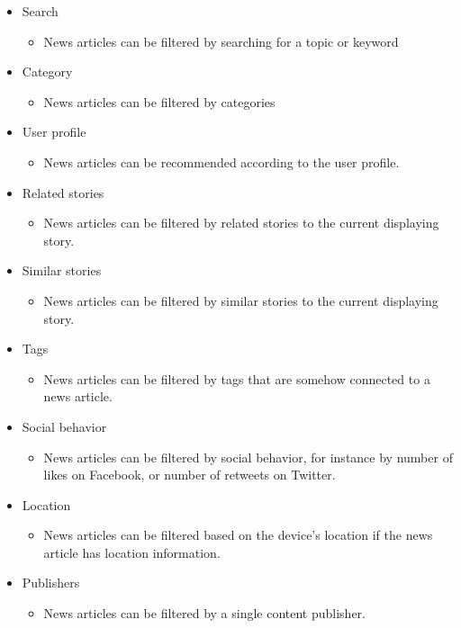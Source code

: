 \begin{itemize}
	\item Search
	\begin{itemize}
		\item News articles can be filtered by searching for a topic or keyword
	\end{itemize}

	\item Category
	\begin{itemize}
		\item News articles can be filtered by categories
	\end{itemize}

	\item User profile
	\begin{itemize}
		\item News articles can be recommended according to the user profile.
	\end{itemize}

	\item Related stories
	\begin{itemize}
		\item News articles can be filtered by related stories to the current displaying story.
	\end{itemize}

	\item Similar stories
	\begin{itemize}
		\item News articles can be filtered by similar stories to the current displaying story.
	\end{itemize}

	\item Tags
	\begin{itemize}
		\item News articles can be filtered by tags that are somehow connected to a news article.
	\end{itemize}

	\item Social behavior
	\begin{itemize}
		\item News articles can be filtered by social behavior, for instance by number of likes on Facebook, or number of retweets on Twitter.
	\end{itemize}

	\item Location
	\begin{itemize}
		\item News articles can be filtered based on the device's location if the news article has location information.
	\end{itemize}

	\item Publishers
	\begin{itemize}
		\item News articles can be filtered by a single content publisher.
	\end{itemize}
\end{itemize}


